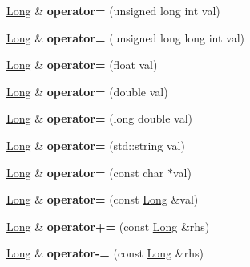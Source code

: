 \begin{DoxyCompactItemize}
\hyperlink{classradix_1_1Long}{Long} \& {\bfseries operator=} (unsigned long int val)
\item 
\mbox{\label{classradix_1_1Long_a20c03d141ec3b80c36d1552066e451d7}} 
\hyperlink{classradix_1_1Long}{Long} \& {\bfseries operator=} (unsigned long long int val)
\item 
\mbox{\label{classradix_1_1Long_a6371a1695ef4d786992a02afd71c9e39}} 
\hyperlink{classradix_1_1Long}{Long} \& {\bfseries operator=} (float val)
\item 
\mbox{\label{classradix_1_1Long_a16dd9c1a39d650de0e1cf3b2636f8fdd}} 
\hyperlink{classradix_1_1Long}{Long} \& {\bfseries operator=} (double val)
\item 
\mbox{\label{classradix_1_1Long_a87d32e61a119f0a05f28245bbf8a1cfc}} 
\hyperlink{classradix_1_1Long}{Long} \& {\bfseries operator=} (long double val)
\item 
\mbox{\label{classradix_1_1Long_a63fe9e2b3670e2914b73639afca8fa42}} 
\hyperlink{classradix_1_1Long}{Long} \& {\bfseries operator=} (std\+::string val)
\item 
\mbox{\label{classradix_1_1Long_a842758eda77e6e2d4f1ca6c1fcff6684}} 
\hyperlink{classradix_1_1Long}{Long} \& {\bfseries operator=} (const char $\ast$val)
\item 
\mbox{\label{classradix_1_1Long_acde06629cdae07ab558f338aa9c9624f}} 
\hyperlink{classradix_1_1Long}{Long} \& {\bfseries operator=} (const \hyperlink{classradix_1_1Long}{Long} \&val)
\item 
\mbox{\label{classradix_1_1Long_a666fd63de5da779999097866422554e4}} 
\hyperlink{classradix_1_1Long}{Long} \& {\bfseries operator+=} (const \hyperlink{classradix_1_1Long}{Long} \&rhs)
\item 
\mbox{\label{classradix_1_1Long_abb38162f1cb185af3b756cf8126cf921}} 
\hyperlink{classradix_1_1Long}{Long} \& {\bfseries operator-\/=} (const \hyperlink{classradix_1_1Long}{Long} \&rhs)
\item 

\end{DoxyCompactItemize}
